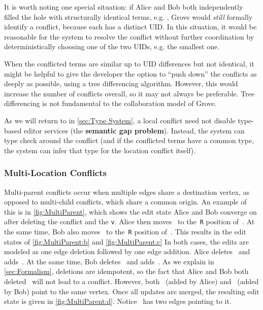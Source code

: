 It is worth noting one special situation: if Alice and Bob both independently filled the hole with structurally identical terms, e.g. , Grove would \emph{still} formally identify a conflict, because each  has a distinct UID. In this situation, it would be reasonable for the system to resolve the conflict without further coordination by deterministically choosing one of the two UIDs, e.g. the smallest one.

When the conflicted terms are similar up to UID differences but not identical, it might be helpful  to give the developer the option to ``push down'' the conflicts as deeply as possible, using a tree differencing algorithm. However, this would increase the number of conflicts overall, so it may not always be preferable. Tree differencing is not fundamental to the collaboration model of Grove.

As we will return to in \autoref{sec:Type System}, 
a local conflict need not disable type-based editor services (the \textbf{semantic gap problem}). Instead, the system can type check around the conflict (and if the conflicted terms have a common type, the system can infer that type for the location conflict itself).

\subsubsection{Multi-Location Conflicts}%
\label{sub:Multi-parent conflicts}

\figureMultiParent

Multi-parent conflicts occur when multiple edges share a destination vertex,
as opposed to multi-child conflicts, which share a common origin.
An example of this is in \autoref{fig:MultiParent},
which shows the edit state Alice and Bob converge on after deleting the conflict and the \texttt{v}.
Alice then moves~\vNestedPartsAlice{} to the~\texttt{R} position of~\vSimpleTimes{}.
At the same time, Bob also moves~\vNestedPartsAlice{} to the~\texttt{R} position of~\vWrapPlus{}.
This results in the edit states of \autoref{fig:MultiParent:b} and \autoref{fig:MultiParent:c}
In both cases, the edits are modeled as one edge deletion followed by one edge addition.
Alice deletes~\eNestedPartsAlice{} and adds~\eMultiParentAlice{}.
At the same time, Bob deletes~\eNestedPartsAlice{} and adds~\eMultiParentBob{}.
As we explain in \autoref{sec:Formalism}, deletions are idempotent,
so the fact that Alice and Bob both deleted~\eNestedPartsAlice{} will not lead to a conflict.
However, both~\eMultiParentAlice{} (added by Alice) and~\eMultiParentBob{} (added by Bob)
point to the same vertex.
Once all updates are merged, the resulting edit state is given in \autoref{fig:MultiParent:d}.
Notice~\vNestedPartsAlice{} has two edges pointing to it.

